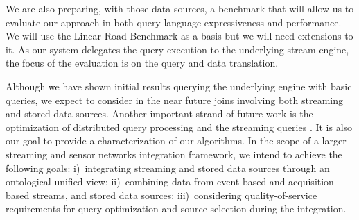 We are also preparing, with those data sources, a benchmark that will allow us to evaluate our approach in both query language expressiveness and performance. We will use the Linear Road Benchmark\cite{Arasu2004} as a basis but we will need extensions to it. As our system delegates the query execution to the underlying stream engine, the focus of the evaluation is on the query and data translation.  

Although we have shown initial results querying the underlying \snee engine with basic queries, we expect to consider in the near future joins involving both streaming and stored data sources.
Another important strand of future work is the optimization of distributed query processing \cite{Kossmann_00} and the streaming queries \cite{Abadi_2005,Galpin_09}.
It is also our goal to provide a characterization of our algorithms. 
In the scope of a larger streaming and sensor networks integration framework, we intend to achieve the following goals: %
i)~integrating streaming and stored data sources through an ontological unified view; %
ii)~combining data from event-based and acquisition-based streams, and stored data sources; %
iii)~considering quality-of-service requirements for query optimization and source selection during the integration.




